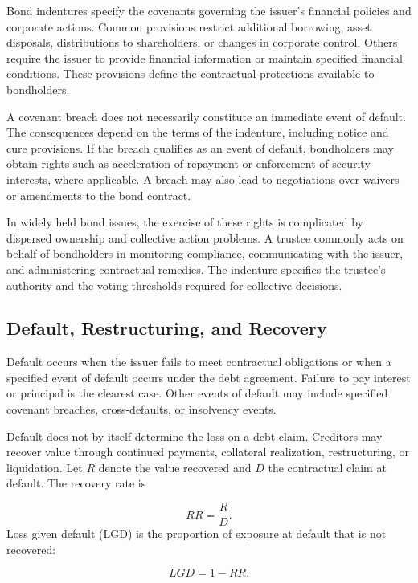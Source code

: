 Bond indentures specify the covenants governing the
issuer's financial policies and corporate actions.
Common provisions restrict additional borrowing,
asset disposals, distributions to shareholders, or
changes in corporate control. Others require the
issuer to provide financial information or maintain
specified financial conditions. These provisions
define the contractual protections available to
bondholders.

A covenant breach does not necessarily constitute
an immediate event of default. The consequences depend
on the terms of the indenture, including notice and
cure provisions. If the breach qualifies as an event
of default, bondholders may obtain rights such as
acceleration of repayment or enforcement of security
interests, where applicable. A breach may also lead
to negotiations over waivers or amendments to the
bond contract.

In widely held bond issues, the exercise of these
rights is complicated by dispersed ownership and
collective action problems. A trustee commonly acts
on behalf of bondholders in monitoring compliance,
communicating with the issuer, and administering
contractual remedies. The indenture specifies the
trustee's authority and the voting thresholds required
for collective decisions.

\subsection{Default, Restructuring, and Recovery}

Default occurs when the issuer fails to meet contractual obligations or when a specified event of default occurs under the debt agreement. Failure to pay interest or principal is the clearest case. Other events of default may include specified covenant breaches, cross-defaults, or insolvency events.

Default does not by itself determine the loss on a debt claim. Creditors may recover value through continued payments, collateral realization, restructuring, or liquidation. Let $R$ denote the value recovered and $D$ the contractual claim at default. The recovery rate is

\begin{equation}
RR=\frac{R}{D}.
\label{eq:ch8-recovery-rate}
\end{equation}
Loss given default (LGD) is the proportion of exposure at default that is not recovered:

\begin{equation}
LGD=1-RR.
\label{eq:ch8-lgd}
\end{equation}

